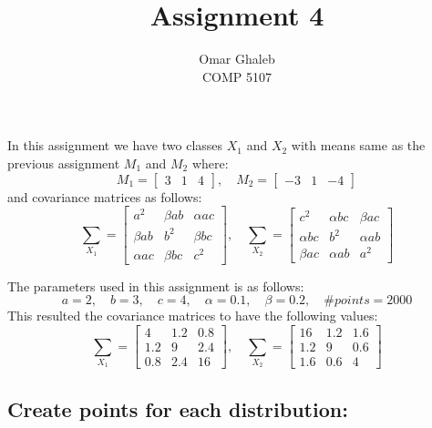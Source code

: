 \documentclass[11pt, oneside]{article}   	%
\title{Assignment 4}
\author{Omar Ghaleb\\
COMP 5107}
\date{}							%
\begin{document}
\renewcommand\thesubsection{\alph{subsection}.}
\maketitle
In this assignment we have two classes $X_1$ and $X_2$ with means same as the previous assignment $M_1$ and $M_2$ where: $$M_1 = \begin{bmatrix}
3 & 1 & 4 
\end{bmatrix},\quad M_2 = \begin{bmatrix}
-3 & 1 & -4 
\end{bmatrix}$$
  and covariance matrices as follows: 
  $$\sum_{X_1} = \begin{bmatrix}
a^2 & \beta ab & \alpha ac \\
\beta ab & b^2 & \beta bc \\
\alpha ac & \beta bc & c^2 
\end{bmatrix},\quad \sum_{X_2} = \begin{bmatrix}
c^2 & \alpha bc & \beta ac \\
\alpha bc & b^2 & \alpha ab \\
\beta ac & \alpha ab & a^2 
\end{bmatrix}$$

The parameters used in this assignment is as follows:
$$ a=2,\quad b=3,\quad c=4,\quad \alpha=0.1,\quad \beta=0.2,\quad \#points = 2000 $$
This resulted the covariance matrices to have the following values:
$$\sum_{X_1} = \begin{bmatrix}
4 & 1.2 & 0.8 \\
1.2 & 9 & 2.4 \\
0.8 & 2.4 & 16 
\end{bmatrix}, \quad \sum_{X_2} = \begin{bmatrix}
16 & 1.2 & 1.6 \\
1.2 & 9 & 0.6 \\
1.6 & 0.6 & 4 
\end{bmatrix}$$


\subsection{Create points for each distribution:}
\end{document}
